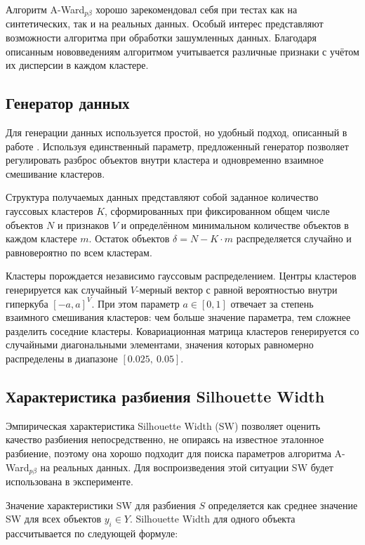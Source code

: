 \documentclass[12pt]{a&t}
\begin{document}
Алгоритм \mbox{A-Ward$ _{p\beta} $} хорошо зарекомендовал себя при тестах как на синтетических, так и на реальных данных. Особый интерес представляют возможности алгоритма при обработки зашумленных данных. Благодаря описанным нововведениям алгоритмом учитывается различные признаки с учётом их дисперсии в каждом кластере. 

\subsection{Генератор данных}\label{sec:data-generation}
Для генерации данных используется простой, но удобный подход, описанный в работе \cite{Kovaleva}. Используя единственный параметр, предложенный генератор позволяет регулировать разброс объектов внутри кластера и одновременно взаимное смешивание кластеров.

Структура получаемых данных представляют собой заданное количество гауссовых кластеров $ K $, сформированных при фиксированном общем числе объектов $ N $ и признаков $ V $ и определённом минимальном количестве объектов в каждом кластере $ m $. Остаток объектов $ \delta = N - K\cdot m $ распределяется случайно и равновероятно по всем кластерам. 

Кластеры порождается независимо гауссовым распределением. Центры кластеров генерируется как случайный $ V $-мерный вектор с равной вероятностью внутри гиперкуба $ [-a,a]^V $. При этом параметр $ a \in [0,1] $ отвечает за степень взаимного смешивания кластеров: чем больше значение параметра, тем сложнее разделить соседние кластеры. Ковариационная матрица кластеров генерируется со случайными диагональными элементами, значения которых равномерно распределены в диапазоне $ [0.025,\:0.05] $.

\subsection{Характеристика разбиения Silhouette Width}\label{sec:sw}
Эмпирическая характеристика Silhouette Width (SW) позволяет оценить качество разбиения непосредственно, не опираясь на известное эталонное разбиение, поэтому она хорошо подходит для поиска параметров алгоритма \mbox{A-Ward$ _{p\beta} $} на реальных данных. Для воспроизведения этой ситуации SW будет использована в эксперименте. 

Значение характеристики SW для разбиения $ S $ определяется как среднее значение SW для всех объектов $ y_i \in Y $. Silhouette Width для одного объекта рассчитывается по следующей формуле:
\end{document}
